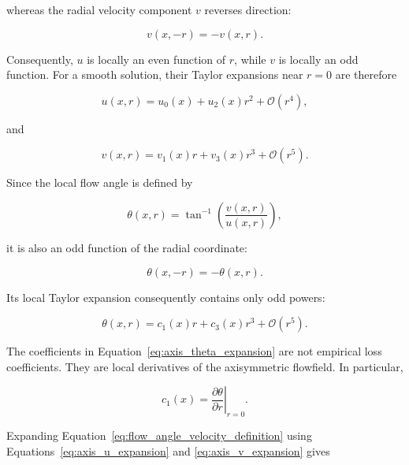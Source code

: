 whereas the radial velocity component \(v\) reverses direction:

\begin{equation}
v(x,-r)=-v(x,r).
\end{equation}

Consequently, \(u\) is locally an even function of \(r\), while \(v\)
is locally an odd function. For a smooth solution, their Taylor
expansions near \(r=0\) are therefore

\begin{equation}
u(x,r)
=
u_0(x)+u_2(x)r^2
+\mathcal{O}(r^4),
\label{eq:axis_u_expansion}
\end{equation}

and

\begin{equation}
v(x,r)
=
v_1(x)r+v_3(x)r^3
+\mathcal{O}(r^5).
\label{eq:axis_v_expansion}
\end{equation}

Since the local flow angle is defined by

\begin{equation}
\theta(x,r)
=
\tan^{-1}
\left(
\frac{v(x,r)}{u(x,r)}
\right),
\label{eq:flow_angle_velocity_definition}
\end{equation}

it is also an odd function of the radial coordinate:

\begin{equation}
\theta(x,-r)=-\theta(x,r).
\end{equation}

Its local Taylor expansion consequently contains only odd powers:

\begin{equation}
\boxed{
\theta(x,r)
=
c_1(x)r+c_3(x)r^3
+\mathcal{O}(r^5)
}.
\label{eq:axis_theta_expansion}
\end{equation}

The coefficients in Equation~\eqref{eq:axis_theta_expansion} are not
empirical loss coefficients. They are local derivatives of the
axisymmetric flowfield. In particular,

\begin{equation}
\boxed{
c_1(x)
=
\left.
\frac{\partial\theta}{\partial r}
\right|_{r=0}
}.
\label{eq:c1_axis_derivative}
\end{equation}

Expanding Equation~\eqref{eq:flow_angle_velocity_definition} using
Equations~\eqref{eq:axis_u_expansion} and
\eqref{eq:axis_v_expansion} gives

